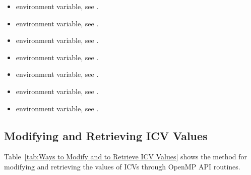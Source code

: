 \begin{itemize}
\item {} environment variable, see .

\item {} environment variable, see .

\item {} environment variable, see .

\item {} environment variable, see .

\item {} environment variable, see .

\item {} environment variable, see .

\item {} environment variable, see .
\end{itemize}








\subsection{Modifying and Retrieving ICV Values}
\label{subsec:Modifying and Retrieving ICV Values}
Table~\ref{tab:Ways to Modify and to Retrieve ICV Values} shows the method 
for modifying and retrieving the values of ICVs through OpenMP API routines.


